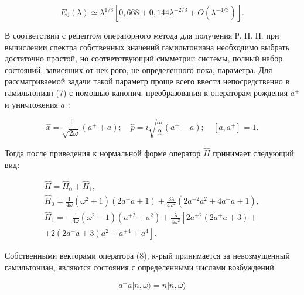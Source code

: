 \documentclass[10pt]{article}
\begin{document}
\[

E_{0}(\lambda) \simeq \lambda^{1 / 3}\left[0,668+0,144 \lambda^{-2 / 3}+O\left(\lambda^{-4 / 3}\right)\right] .

\]



В соответствии с рецептом операторного метода для получения Р. П. П. при вычислении спектра собственных значений гамильтониана необходимо выбрать достаточно простой, но соответствующий симметрии системы, полный набор состояний, зависящих от нек-рого, не определенного пока, параметра. Для рассматриваемой задачи такой параметр проще всего ввести непосредственно в гамильтониан (7) с помошью канонич. преобразования к операторам рождения $a^{+}$и уничтожения $a$ :



\[

\hat{x}=\frac{1}{\sqrt{2 \omega}}\left(a^{+}+a\right) ; \quad \hat{p}=i \sqrt{\frac{\omega}{2}}\left(a^{+}-a\right) ; \quad\left[a, a^{+}\right]=1 .

\]



Тогда после приведения к нормальной форме оператор $\hat{H}$ принимает следующий вид:



\[

\begin{gathered}

\hat{H}=\hat{H}_{0}+\hat{H}_{1}, \\

\hat{H}_{0}=\frac{1}{4 \omega}\left(\omega^{2}+1\right)\left(2 a^{+} a+1\right)+\frac{3 \lambda}{4 \omega^{2}}\left(2 a^{+2} a^{2}+4 a^{+} a+1\right), \\

\hat{H}_{1}=-\frac{1}{4 \omega}\left(\omega^{2}-1\right)\left(a^{+2}+a^{2}\right)+\frac{\lambda}{4 \omega^{2}}\left[2 a^{+2}\left(2 a^{+} a+3\right)+\right. \\

\left.+2\left(2 a^{+} a+3\right) a^{2}+a^{+4}+a^{4}\right] .

\end{gathered}

\]



Собственными векторами оператора (8), к-рый принимается за невозмущенный гамильтониан, являются состояния с определенными числами возбуждений



\[

a^{+} a|n, \omega\rangle=n|n, \omega\rangle

\]
\end{document}

